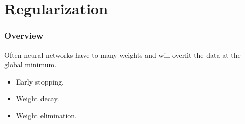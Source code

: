 \section{Regularization}

\begin{frame}
    \frametitle{Overview}
    Often neural networks have to many weights and will overfit the data at 
    the global minimum.
    
    \begin{itemize}
        \item Early stopping.
        \item Weight decay. 
        \item Weight elimination.
    \end{itemize}
\end{frame}

\